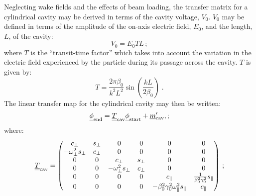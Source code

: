 Neglecting wake fields and the effects of beam loading, the transfer
matrix for a cylindrical cavity may be derived in terms of the cavity
voltage, $V_0$.
$V_0$ may be defined in terms of the amplitude of the on-axis electric
field, $E_0$, and the length, $L$, of the cavity:
\begin{equation}
  V_0 = E_0 T L \, ;
\end{equation}
where $T$ is the ``transit-time factor'' which takes into account the
variation in the electric field experienced by the particle during its
passage across the cavity.
$T$ is given by:
\begin{equation}
  T = \frac{2\pi\beta_0}{k^2L^2} \sin\left( \frac{k L}{2\beta_0} \right) \; .
  \label{Eq:TrnsMat:CylCav:TransitTimeFactor}
\end{equation}
The linear transfer map for the cylindrical cavity may then be
written:
\begin{equation}
  \underline{\phi}_{\rm end} = \underline{\underline{T}}_{\rm cav}
                              \underline{\phi}_{\rm start} +
                              \underline{m}_{\rm cav} ', ;
\end{equation}
where:
\begin{equation}
  \underline{\underline{T}}_{\rm cav} =
    \begin{pmatrix}
                       c_\perp & s_\perp &                      0 &      0 &                                                 0 &                                        0 \\
        -\omega_\perp^2 s_\perp & c_\perp &                      0 &      0 &                                                 0 &                                        0 \\
                            0 &       0 &                c_\perp & s_\perp &                                                 0 &                                        0 \\
                            0 &       0 & -\omega_\perp^2 s_\perp & c_\perp &                                                 0 &                                        0 \\
                            0 &       0 &                      0 &      0 &                                        c_\parallel & \frac{1}{\beta_0^2 \gamma_0^2} s_\parallel \\
                            0 &       0 &                      0 &      0 & -\beta_0^2 \gamma_0^2 \omega^2_\parallel s_\parallel & c_\parallel                                \\
        \end{pmatrix} \, ;
\end{equation}
